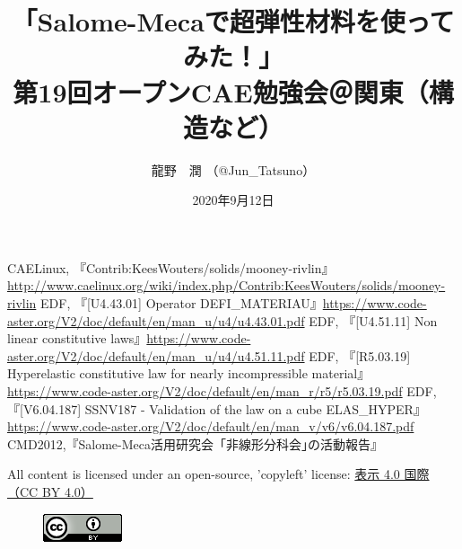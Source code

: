 \documentclass[a4j,20pt,slide]{ltjsarticle}
\title{「Salome-Mecaで超弾性材料を使ってみた！」\\第19回オープンCAE勉強会＠関東（構造など）}
\author{龍野　潤 （@Jun\_Tatsuno）}
\date{2020年9月12日}
\begin{document}
\maketitle
\thispagestyle{plain}
\tableofcontents
%



\appendix

%
\clearpage
\begin{thebibliography}{9}
	 CAELinux, 『Contrib:KeesWouters/solids/mooney-rivlin』 \href{http://www.caelinux.org/wiki/index.php/Contrib:KeesWouters/solids/mooney-rivlin}{http://www.caelinux.org/wiki/index.php/Contrib:KeesWouters/solids/mooney-rivlin}
	 EDF, 『[U4.43.01] Operator DEFI\_MATERIAU』\href{https://www.code-aster.org/V2/doc/default/en/man_u/u4/u4.43.01.pdf}{https://www.code-aster.org/V2/doc/default/en/man\_u/u4/u4.43.01.pdf}
	 EDF, 『[U4.51.11] Non linear constitutive laws』\href{https://www.code-aster.org/V2/doc/default/en/man_u/u4/u4.51.11.pdf}{https://www.code-aster.org/V2/doc/default/en/man\_u/u4/u4.51.11.pdf}
	 EDF, 『[R5.03.19] Hyperelastic constitutive law for nearly incompressible material』\href{https://www.code-aster.org/V2/doc/default/en/man_r/r5/r5.03.19.pdf}{https://www.code-aster.org/V2/doc/default/en/man\_r/r5/r5.03.19.pdf}
	 EDF,『[V6.04.187] SSNV187 - Validation of the law on a cube ELAS\_HYPER』\href{https://www.code-aster.org/V2/doc/default/en/man_v/v6/v6.04.187.pdf}{https://www.code-aster.org/V2/doc/default/en/man\_v/v6/v6.04.187.pdf}
	CMD2012,『Salome-Meca活用研究会「非線形分科会｣の活動報告』
\end{thebibliography}
All content is licensed under an open-source, 'copyleft' license: \href{https://creativecommons.org/licenses/by/4.0/deed.ja}{表示 4.0 国際 （CC BY 4.0）}
\begin{figure}[htbp]
	\centering
	\includegraphics{fig/license.png}
\end{figure}
\end{document}
